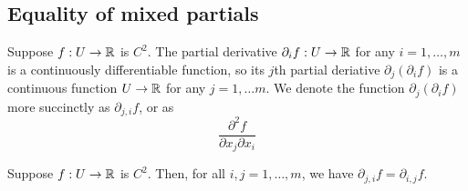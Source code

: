 \subsection{Equality of mixed partials \starred}

\begin{definition} 
	Suppose $f : U \to \mathbb{R}$ is $C^2$. The partial derivative $\partial_i f : U \to \mathbb{R}$ for any $i = 1, \dotsc, m$ is a continuously differentiable function, so its $j$th partial deriative $\partial_j( \partial_i f)$ is a continuous function $U \to \mathbb{R}$ for any $j = 1, \dotsc m$. We denote the function $\partial_j(\partial_i f)$ more succinctly as $\partial_{j,i} f$, or as
	\[ \frac{\partial^2 f}{\partial x_j \partial x_i} \]
\end{definition}

\begin{theorem} \label{mixed-partials} 
	Suppose $f : U \to \mathbb{R}$ is $C^2$. Then, for all $i, j = 1, \dotsc, m$, we have $\partial_{j,i} f = \partial_{i,j} f$.
\end{theorem}

